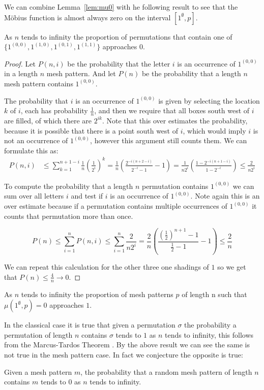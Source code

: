\documentclass[11pt,a4paper,oneside]{article}
\begin{document}
We can combine Lemma~\ref{lem:mu0} with he following result to see that the
M\"obius function is almost always zero on the interval $[1^\emptyset,p]$.

\begin{lem}
As $n$ tends to infinity the proportion of permutations that contain one of
$\{1^{(0,0)},1^{(1,0)},1^{(0,1)},1^{(1,1)}\}$ approaches $0$.
\begin{proof}
Let $P(n,i)$ be the probability that the letter $i$ is an occurrence of
$1^{(0,0)}$ in a length $n$ mesh pattern. And let $P(n)$ be the probability
that a length $n$ mesh pattern contains $1^{(0,0)}$.

The probability that $i$ is an occurrence of $1^{(0,0)}$ is given by selecting
the location $k$ of $i$, each has probability $\frac{1}{n}$, and then we require
that all boxes south west of $i$ are filled, of which there are $2^{ik}$. Note
that this over estimates the probability, because it is possible that there is a
point south west of $i$, which would imply $i$ is not an occurrence of
$1^{(0,0)}$, however this argument still counts them. We can formulate this as:
\begin{align*}
P(n,i)&\le\sum_{k=1}^{n+1-i}\frac{1}{n}\left(\frac{1}{2^i}\right)^k=\frac{1}{n}\left(\frac{2^{-i(n+2-i)}}{2^{-i}-1}-1\right)=\frac{1}{n2^i}\left(\frac{1-2^{-i(n+1-i)}}{1-2^{-i}}\right)\le\frac{2}{n2^i}
\end{align*}

To compute the probability that a length $n$ permutation contains $1^{(0,0)}$ we
can sum over all letters $i$ and test if $i$ is an occurrence of $1^{(0,0)}$.
Note again this is an over estimate because if a permutation contains multiple
occurrences of $1^{(0,0)}$ it counts that permutation more than once.

$$
P(n)\le\sum_{i=1}^{n}P(n,i)\le\sum_{i=1}^{n}\frac{2}{n2^i}=\frac{2}{n}\left(\frac{\left(\frac{1}{2}\right)^{n+1}-1}{\frac{1}{2}-1}-1\right)\le\frac{2}{n}
$$

We can repeat this calculation for the other three one shadings of $1$ so we get
that $P(n)\le \frac{4}{n}\rightarrow 0$.
\end{proof}
\end{lem}
\begin{cor}
As $n$ tends to infinity the proportion of mesh patterns $p$ of length n such
that $\mu(1^\emptyset,p)=0$ approaches $1$.
\end{cor}


In the classical case it is true that given a permutation $\sigma$ the
probability a permutation of length $n$ contains $\sigma$ tends to $1$ as $n$
tends to infinity, this follows from the Marcus-Tardos Theorem \cite{MT04}. By
the above result we can see the same is not true in the mesh pattern case. In
fact we conjecture the opposite is true:
\begin{conj}
Given a mesh pattern $m$, the probability that a random mesh pattern of length
$n$ contains $m$ tends to $0$ as $n$ tends to infinity.
\end{conj}
\end{document}
